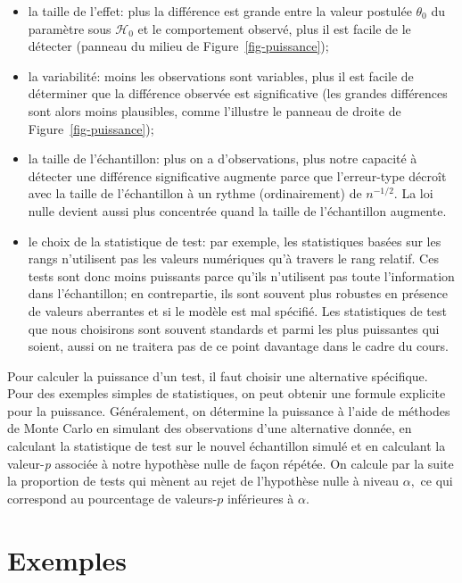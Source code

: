\documentclass[
  11pt,
  letterpaper,
]{scrbook}
\providecommand{\tightlist}{%
  \setlength{\itemsep}{0pt}\setlength{\parskip}{0pt}}\usepackage{longtable,booktabs,array}
\theoremstyle{plain}
\theoremstyle{plain}
\theoremstyle{definition}
\theoremstyle{definition}
\theoremstyle{remark}
\begin{document}
\begin{itemize}
\tightlist
\item
  la taille de l'effet: plus la différence est grande entre la valeur
  postulée \(\theta_0\) du paramètre sous \(\mathscr{H}_0\) et le
  comportement observé, plus il est facile de le détecter (panneau du
  milieu de Figure~\ref{fig-puissance});
\item
  la variabilité: moins les observations sont variables, plus il est
  facile de déterminer que la différence observée est significative (les
  grandes différences sont alors moins plausibles, comme l'illustre le
  panneau de droite de Figure~\ref{fig-puissance});
\item
  la taille de l'échantillon: plus on a d'observations, plus notre
  capacité à détecter une différence significative augmente parce que
  l'erreur-type décroît avec la taille de l'échantillon à un rythme
  (ordinairement) de \(n^{-1/2}.\) La loi nulle devient aussi plus
  concentrée quand la taille de l'échantillon augmente.
\item
  le choix de la statistique de test: par exemple, les statistiques
  basées sur les rangs n'utilisent pas les valeurs numériques qu'à
  travers le rang relatif. Ces tests sont donc moins puissants parce
  qu'ils n'utilisent pas toute l'information dans l'échantillon; en
  contrepartie, ils sont souvent plus robustes en présence de valeurs
  aberrantes et si le modèle est mal spécifié. Les statistiques de test
  que nous choisirons sont souvent standards et parmi les plus
  puissantes qui soient, aussi on ne traitera pas de ce point davantage
  dans le cadre du cours.
\end{itemize}

Pour calculer la puissance d'un test, il faut choisir une alternative
spécifique. Pour des exemples simples de statistiques, on peut obtenir
une formule explicite pour la puissance. Généralement, on détermine la
puissance à l'aide de méthodes de Monte Carlo en simulant des
observations d'une alternative donnée, en calculant la statistique de
test sur le nouvel échantillon simulé et en calculant la valeur-\emph{p}
associée à notre hypothèse nulle de façon répétée. On calcule par la
suite la proportion de tests qui mènent au rejet de l'hypothèse nulle à
niveau \(\alpha,\) ce qui correspond au pourcentage de valeurs-\(p\)
inférieures à \(\alpha.\)

\section{Exemples}\label{exemples}
\end{document}
